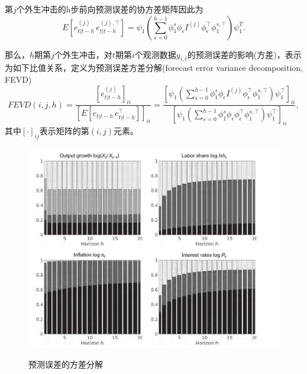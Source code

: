 第$j$个外生冲击的h步前向预测误差的协方差矩阵因此为
\begin{equation}
  \label{eq:stylized-ssrep-forecast-error-j-matrix}
  E \left[ e_{t | t-h}^{(j)} \, e_{t | t-h}^{(j), \top} \right]
  = \psi_{1}
  \left(
  \sum_{s=0}^{h-1} \phi_{1}^{s} \phi_{\epsilon} I^{(j)} \phi_{\epsilon}^{\top} \phi_{1}^{s, \top}
  \right) \psi_{1}^{T}.
\end{equation}

那么，$h$期第$j$个外生冲击，对$t$期第$i$个观测数据$y_{i,t}$的预测误差的影响(方差)，表示为如下比值关系，定义为预测误差方差分解(forecast error variance decomposition, FEVD)
\begin{equation}
  \label{eq:stylized-ssrep-forecast-fevd}
  FEVD\left ( i,j,h \right) =
  \frac{
  \left[
  e^{(j)}_{t | t-h}
  \right]_{ii}
  }{
  \left[
  E \left[ e_{t|t-h} \, e_{t|t-h}^{\top} \right]
  \right]_{ii}
  }=
  \frac{
  \left[
  \psi_{1}
  \left(
  \sum_{s=0}^{h-1} \phi_{1}^{s} \phi_{\epsilon} I^{(j)} \phi_{\epsilon}^{\top} \phi_{1}^{s,\top}
  \right)
  \psi_{1}^{\top}
  \right]_{ii}
  }{
  \left[
  \psi_{1}
  \left(
  \sum_{s=0}^{h-1}
  \phi_{1}^{s} \phi_{\epsilon} \phi_{\epsilon}^{\top} \phi_{1}^{s,\top}
  \right)
  \psi_{1}^{\top}
  \right]_{ii}
  },
\end{equation}
其中$\left[ \cdot \right]_{ij}$表示矩阵的第$(i,j)$元素。

\begin{figure}[htbp]
  \caption{预测误差的方差分解}
  \centering
  \includegraphics[width=12cm]{./Figures/20180401-fevd}
  \label{fig:stylized-ssrep-fevd}
%
\end{figure}

